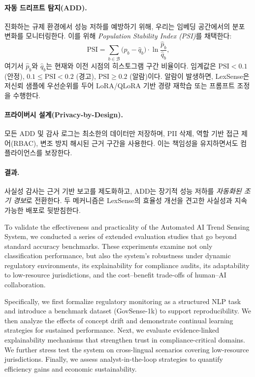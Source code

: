{\paragraph{자동 드리프트 탐지(ADD).}
진화하는 규제 환경에서 성능 저하를 예방하기 위해, 
우리는 임베딩 공간에서의 분포 변화를 모니터링한다.  
이를 위해 \emph{Population Stability Index (PSI)}를 채택한다:
\[
\mathrm{PSI}=\sum_{b\in \mathcal{B}}
\big(\hat{p}_b-\hat{q}_b\big)\cdot \ln\frac{\hat{p}_b}{\hat{q}_b},
\]
여기서 $\hat{p}_b$와 $\hat{q}_b$는 현재와 이전 시점의 히스토그램 구간 비율이다.  
임계값은 $\mathrm{PSI}<0.1$ (안정), $0.1\!\le\!\mathrm{PSI}\!<\!0.2$ (경고), $\mathrm{PSI}\!\ge\!0.2$ (알람)이다.  
알람이 발생하면, LexSense은 저신뢰 샘플에 우선순위를 두어 
LoRA/QLoRA 기반 경량 재학습 또는 프롬프트 조정을 수행한다.

\paragraph{프라이버시 설계(Privacy-by-Design).}
모든 ADD 및 감사 로그는 최소한의 데이터만 저장하며, 
PII 삭제, 역할 기반 접근 제어(RBAC), 변조 방지 해시된 근거 구간을 사용한다.  
이는 책임성을 유지하면서도 컴플라이언스를 보장한다.

\paragraph{결과.}
사실성 감사는 근거 기반 보고를 제도화하고, 
ADD는 장기적 성능 저하를 \emph{자동화된 조기 경보}로 전환한다. 
두 메커니즘은 LexSense의 효율성 개선을 견고한 사실성과 지속 가능한 배포로 뒷받침한다.


}{%



To validate the effectiveness and practicality of the Automated AI Trend Sensing System, 
we conducted a series of extended evaluation studies that go beyond standard accuracy benchmarks. 
These experiments examine not only classification performance, but also the system’s 
robustness under dynamic regulatory environments, its explainability for compliance audits, 
its adaptability to low-resource jurisdictions, and the cost–benefit trade-offs of 
human–AI collaboration. 

Specifically, we first formalize regulatory monitoring as a structured NLP task and introduce 
a benchmark dataset (GovSense-1k) to support reproducibility. We then analyze the effects of 
concept drift and demonstrate continual learning strategies for sustained performance. 
Next, we evaluate evidence-linked explainability mechanisms that strengthen trust in 
compliance-critical domains. We further stress test the system on cross-lingual scenarios 
covering low-resource jurisdictions. Finally, we assess analyst-in-the-loop strategies to 
quantify efficiency gains and economic sustainability. 

}
